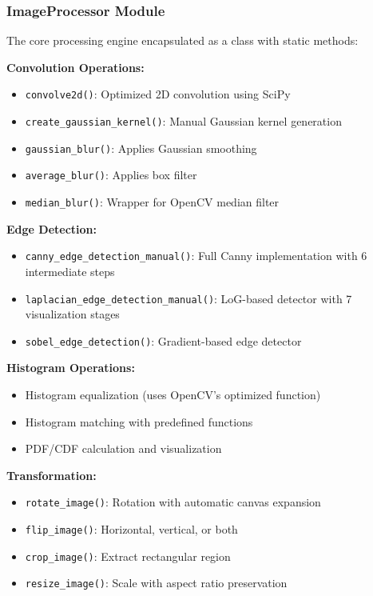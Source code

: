 \documentclass[12pt,a4paper]{article}
\begin{document}
\subsubsection{ImageProcessor Module}

The core processing engine encapsulated as a class with static methods:

\textbf{Convolution Operations:}
\begin{itemize}
    \item \texttt{convolve2d()}: Optimized 2D convolution using SciPy
    \item \texttt{create\_gaussian\_kernel()}: Manual Gaussian kernel generation
    \item \texttt{gaussian\_blur()}: Applies Gaussian smoothing
    \item \texttt{average\_blur()}: Applies box filter
    \item \texttt{median\_blur()}: Wrapper for OpenCV median filter
\end{itemize}

\textbf{Edge Detection:}
\begin{itemize}
    \item \texttt{canny\_edge\_detection\_manual()}: Full Canny implementation with 6 intermediate steps
    \item \texttt{laplacian\_edge\_detection\_manual()}: LoG-based detector with 7 visualization stages
    \item \texttt{sobel\_edge\_detection()}: Gradient-based edge detector
\end{itemize}

\textbf{Histogram Operations:}
\begin{itemize}
    \item Histogram equalization (uses OpenCV's optimized function)
    \item Histogram matching with predefined functions
    \item PDF/CDF calculation and visualization
\end{itemize}

\textbf{Transformation:}
\begin{itemize}
    \item \texttt{rotate\_image()}: Rotation with automatic canvas expansion
    \item \texttt{flip\_image()}: Horizontal, vertical, or both
    \item \texttt{crop\_image()}: Extract rectangular region
    \item \texttt{resize\_image()}: Scale with aspect ratio preservation
\end{itemize}
\end{document}
